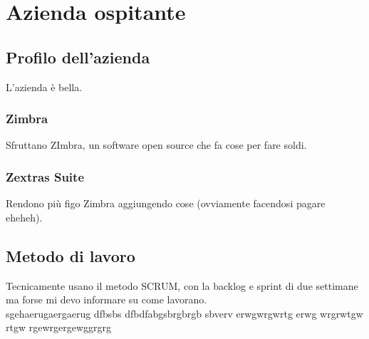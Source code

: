 \chapter{Azienda ospitante}

\section{Profilo dell'azienda}
L'azienda è bella.

\subsection{Zimbra}
Sfruttano ZImbra, un software open source che fa cose per fare soldi.

\subsection{Zextras Suite}
Rendono più figo Zimbra aggiungendo cose (ovviamente facendosi pagare eheheh).

\section{Metodo di lavoro}
Tecnicamente usano il metodo SCRUM, con la backlog e sprint di due settimane ma forse mi devo informare su come lavorano. \\



sgehaerugaergaerug  dfbsbs dfbdfabgsbrgbrgb sbverv
 erwgwrgwrtg 
 erwg wrgrwtgw
 rtgw
 rgewrgergewggrgrg